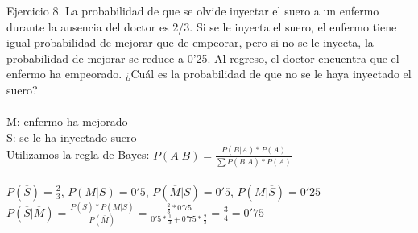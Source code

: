 \documentclass{article}
\begin{document}
Ejercicio 8. La probabilidad de que se olvide inyectar el suero a un enfermo durante la ausencia del doctor es 2/3. Si se le inyecta el suero, el enfermo tiene igual probabilidad de mejorar que de empeorar, pero si no se le inyecta, la probabilidad de mejorar se reduce a 0'25. Al regreso, el doctor encuentra que el enfermo ha empeorado. ¿Cuál es la probabilidad de que no se le haya inyectado el suero? \\ \\
M: enfermo ha mejorado \\
S: se le ha inyectado suero \\
Utilizamos la regla de Bayes: $P(A|B) = \frac{P(B|A)*P(A)}{\sum P(B|A)*P(A)}$ \\ \\
$P(\overline{S}) = \frac{2}{3}$, $P(M|S) = 0'5$, $P(\overline{M}|S) = 0'5$, $P(M|\overline{S}) = 0'25$ \\ 
$P(\overline{S}|\overline{M}) = \frac{P(\overline{S})*P(\overline{M}|\overline{S})}{P(\overline{M})} = \frac{\frac{2}{3}*0'75}{0'5*\frac{1}{3}+0'75*\frac{2}{3}}= \frac{3}{4} = 0'75$
\end{document}
